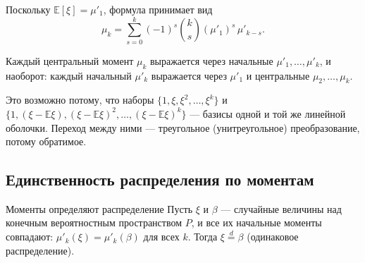 \begin{Corollary}{}{}
	Поскольку $\mathbb{E}[\xi]=\mu'_1$, формула принимает вид
	\[
	\mu_k=\sum_{s=0}^{k}(-1)^s\binom{k}{s}(\mu'_1)^s\,\mu'_{k-s}.
	\]
\end{Corollary}

\begin{Corollary}{}{}
	Каждый центральный момент $\mu_k$ выражается через начальные $\mu'_1,\dots,\mu'_k$, и наоборот: каждый начальный $\mu'_k$ выражается через $\mu'_1$ и центральные $\mu_2,\dots,\mu_k$.
\end{Corollary}

\begin{Remark}{}{}
	Это возможно потому, что наборы $\{1,\xi,\xi^2,\ldots,\xi^k\}$ и $\{1,(\xi-\mathbb E\xi),(\xi-\mathbb E\xi)^2,\ldots,(\xi-\mathbb E\xi)^k\}$ — базисы одной и той же линейной оболочки. Переход между ними — треугольное (унитреугольное) преобразование, потому обратимое.
\end{Remark}

\subsection{Единственность распределения по моментам}

\begin{Theorem}{Моменты определяют распределение}{}
	Пусть $\xi$ и $\beta$ — случайные величины над конечным вероятностным пространством $P$, и все их начальные моменты совпадают: $\mu'_k(\xi)=\mu'_k(\beta)$ для всех $k$. Тогда $\xi\overset{d}{=}\beta$ (одинаковое распределение).
\end{Theorem}

